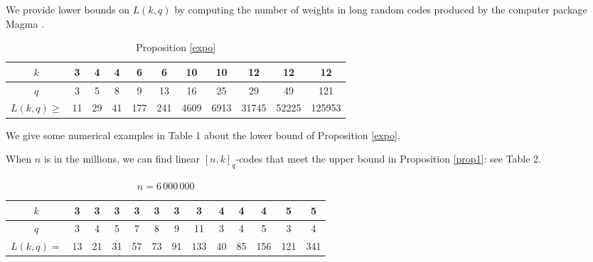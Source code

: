 \documentclass[12pt]{article}
\theoremstyle{definition}
\begin{document}
We provide lower bounds on $L(k,q)$ by computing the number of weights in long random codes produced by the computer package Magma \cite{M}.
\begin{table}
\begin{center}
\noindent\caption{Proposition \ref{expo}}\vspace{0.2cm}
\begin{tabular}{|c|cccccccccc|}
  \hline
   $k $                         & 3       & 4      & 4      & 6       & 6       & 10        & 10        & 12     & 12      & 12 \\
  \hline $q $                   & 3       & 5      & 8      & 9       & 13      & 16        & 25        & 29     & 49      & 121  \\
  \hline $L(k,q)\ge$          & 11      & 29     & 41     & 177     & 241     & 4609      & 6913      & 31745  & 52225   & 125953  \\
  \hline
\end{tabular}
\end{center}
\end{table}
We give some numerical examples in Table 1 about the lower bound of Proposition \ref{expo}.

When $n$ is in the millions, we can find linear $[n,k]_q$-codes that meet the upper bound in Proposition \ref{prop1}: see Table 2.
\begin{table}
\begin{center}
\noindent\caption{ $n=6 \,000\, 000$ } \vspace{0.2cm}
\begin{tabular}{|c|cccccccccccc|}
  \hline
   $k $                         & 3       & 3      & 3   &3     & 3     &3  &3    & 4       & 4        & 4        & 5     & 5       \\
  \hline $q $                   & 3       & 4      & 5   &7     & 8     &9  &11    & 3      & 4        & 5        & 3     & 4        \\
  \hline $L(k,q)=$               & 13      & 21     & 31  &57    & 73    &91 &133    & 40     & 85      & 156      & 121  & 341    \\
  \hline
\end{tabular}
\end{center}
\end{table}
\end{document}
